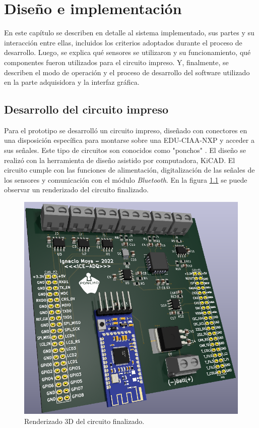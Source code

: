 \chapter{Diseño e implementación} %

\label{Chapter3}

En este capítulo se describen en detalle al sistema implementado, sus partes y su interacción entre ellas, incluidos los criterios adoptados durante el proceso de desarrollo. Luego, se explica qué sensores se utilizaron y su funcionamiento, qué componentes fueron utilizados para el circuito impreso. Y, finalmente, se describen el modo de operación y el proceso de desarrollo del software utilizado en la parte adquisidora y la interfaz gráfica.

\section{Desarrollo del circuito impreso} \label{circuito}

Para el prototipo se desarrolló un circuito impreso, diseñado con conectores en una disposición específica para montarse sobre una EDU-CIAA-NXP y acceder a sus señales. Este tipo de circuitos son conocidos como "ponchos" \cite{poncho}. El diseño se realizó con la herramienta de diseño asistido por computadora, KiCAD. El circuito cumple con las funciones de alimentación, digitalización de las señales de los sensores y comunicación con el módulo \textit{Bluetooth}. En la figura \ref{fig:circuito-3d} se puede observar un renderizado del circuito finalizado. 

\begin{figure}[htpb]
\centering
\includegraphics[width=.8\textwidth]{./Figures/circuito-3d.png}
\caption{Renderizado 3D del circuito finalizado.}
\label{fig:circuito-3d}
\end{figure}


